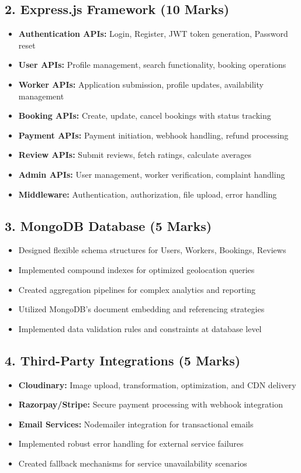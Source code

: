 \documentclass[12pt,a4paper]{article}
\begin{document}
\subsection*{2. Express.js Framework (10 Marks)}
\begin{itemize}[leftmargin=*]
    \item \textbf{Authentication APIs:} Login, Register, JWT token generation, Password reset
    \item \textbf{User APIs:} Profile management, search functionality, booking operations
    \item \textbf{Worker APIs:} Application submission, profile updates, availability management
    \item \textbf{Booking APIs:} Create, update, cancel bookings with status tracking
    \item \textbf{Payment APIs:} Payment initiation, webhook handling, refund processing
    \item \textbf{Review APIs:} Submit reviews, fetch ratings, calculate averages
    \item \textbf{Admin APIs:} User management, worker verification, complaint handling
    \item \textbf{Middleware:} Authentication, authorization, file upload, error handling
\end{itemize}

\subsection*{3. MongoDB Database (5 Marks)}
\begin{itemize}[leftmargin=*]
    \item Designed flexible schema structures for Users, Workers, Bookings, Reviews
    \item Implemented compound indexes for optimized geolocation queries
    \item Created aggregation pipelines for complex analytics and reporting
    \item Utilized MongoDB's document embedding and referencing strategies
    \item Implemented data validation rules and constraints at database level
\end{itemize}

\subsection*{4. Third-Party Integrations (5 Marks)}
\begin{itemize}[leftmargin=*]
    \item \textbf{Cloudinary:} Image upload, transformation, optimization, and CDN delivery
    \item \textbf{Razorpay/Stripe:} Secure payment processing with webhook integration
    \item \textbf{Email Services:} Nodemailer integration for transactional emails
    \item Implemented robust error handling for external service failures
    \item Created fallback mechanisms for service unavailability scenarios
\end{itemize}
\end{document}
